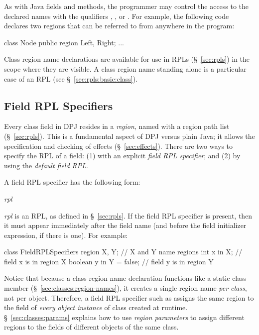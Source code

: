 As with Java fields and methods, the programmer may control the access
to the declared names with the qualifiers , ,
or .  For example, the following code declares two
regions that can be referred to from anywhere in the program:

\begin{dpjlisting}
class Node {
	public region Left, Right;
	...
}
\end{dpjlisting}

Class region name declarations are available for use in RPLs
(\S~\ref{sec:rpls}) in the scope where they are visible.  A class
region name standing alone is a particular case of an RPL (see
\S~\ref{sec:rpls:basic:class}).

\subsection{Field RPL Specifiers%
\label{sec:classes:field-region-spec}}

Every class field in DPJ resides in a \emph{region}, named with a
region path list (\S~\ref{sec:rpls}).  This is a fundamental aspect of
DPJ versus plain Java; it allows the specification and checking of
effects (\S~\ref{sec:effects}). There are two ways to specify the RPL
of a field: (1) with an explicit \emph{field RPL specifier}; and (2)
by using the \emph{default field RPL}.

 A field RPL specifier has the
following form:
%
\begin{description}
\item {} \emph{rpl}
\end{description}
%
\emph{rpl} is an RPL, as defined in \S~\ref{sec:rpls}.  If the field
RPL specifier is present, then it must appear immediately after the
field name (and before the field initializer expression, if there is
one).  For example:
%
\begin{dpjlisting}
class FieldRPLSpecifiers {
    region X, Y;             // X and Y name regions
    int x in X;              // field x is in region X
    boolean y in Y = false;  // field y is in region Y
}
\end{dpjlisting}
%
Notice that because a class region name declaration functions like a
static class member (\S~\ref{sec:classes:region-names}), it creates a
single region name \emph{per class}, not per object.  Therefore, a
field RPL specifier such as  assigns the same
region  to the field of \emph{every object
  instance} of class  created at runtime.
\S~\ref{sec:classes:params} explains how to use \emph{region
  parameters} to assign different regions to the fields of different
objects of the same class.


